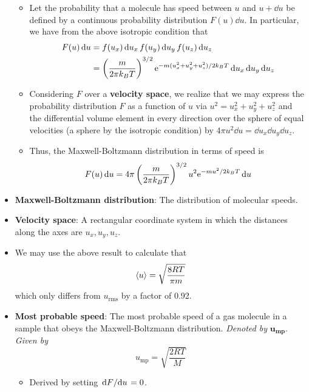 \documentclass[../notes.tex]{subfiles}
\begin{document}
\begin{itemize}
    \begin{itemize}
        \item Let the probability that a molecule has speed between $u$ and $u+\dd{u}$ be defined by a continuous probability distribution $F(u)\dd{u}$. In particular, we have from the above isotropic condition that
        \begin{align*}
            F(u)\dd{u} &= f(u_x)\dd{u_x}f(u_y)\dd{u_y}f(u_z)\dd{u_z}\\
            &= \left( \frac{m}{2\pi k_BT} \right)^{3/2}\e[-m(u_x^2+u_y^2+u_z^2)/2k_BT]\dd{u_x}\dd{u_y}\dd{u_z}
        \end{align*}
        \item Considering $F$ over a \textbf{velocity space}, we realize that we may express the probability distribution $F$ as a function of $u$ via $u^2=u_x^2+u_y^2+u_z^2$ and the differential volume element in every direction over the sphere of equal velocities (a sphere by the isotropic condition) by $4\pi u^2\dd{u}=\dd{u_x}\dd{u_y}\dd{u_z}$.
        \item Thus, the Maxwell-Boltzmann distribution in terms of speed is
        \begin{equation*}
            F(u)\dd{u} = 4\pi\left( \frac{m}{2\pi k_BT} \right)^{3/2}u^2\e[-mu^2/2k_BT]\dd{u}
        \end{equation*}
    \end{itemize}
    \item \textbf{Maxwell-Boltzmann distribution}: The distribution of molecular speeds.
    \item \textbf{Velocity space}: A rectangular coordinate system in which the distances along the axes are $u_x,u_y,u_z$.
    \item We may use the above result to calculate that
    \begin{equation*}
        \prb{u} = \sqrt{\frac{8RT}{\pi m}}
    \end{equation*}
    which only differs from $u_\text{rms}$ by a factor of 0.92.
    \item \textbf{Most probable speed}: The most probable speed of a gas molecule in a sample that obeys the Maxwell-Boltzmann distribution. \emph{Denoted by} $\bm{u_\text{mp}}$. \emph{Given by}
    \begin{equation*}
        u_\text{mp} = \sqrt{\frac{2RT}{M}}
    \end{equation*}
    \begin{itemize}
        \item Derived by setting $\dv*{F}{u}=0$.

\end{itemize}
\end{itemize}
\end{document}
